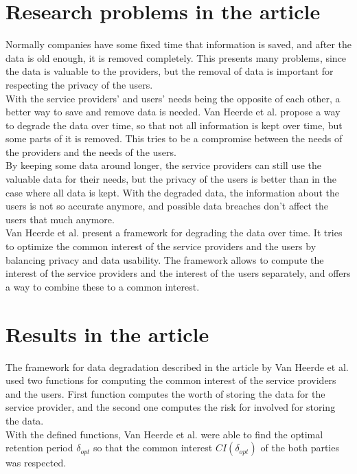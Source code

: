 \documentclass[a4paper,12pt,oneside,fleqn]{article}
\begin{document}
\section{Research problems in the article}

Normally companies have some fixed time that information is saved, and
after the data is old enough, it is removed completely. This presents
many problems, since the data is valuable to the providers, but the
removal of data is important for respecting the privacy of the
users.\\

With the service providers' and users' needs being the opposite of
each other, a better way to save and remove data is needed. Van Heerde
et al. propose a way to degrade the data over time, so that not all
information is kept over time, but some parts of it is removed. This
tries to be a compromise between the needs of the providers and the
needs of the users.\\

By keeping some data around longer, the service providers can still
use the valuable data for their needs, but the privacy of the users is
better than in the case where all data is kept. With the degraded
data, the information about the users is not so accurate anymore, and
possible data breaches don't affect the users that much anymore.\\

Van Heerde et al. present a framework for degrading the data over
time. It tries to optimize the common interest of the service
providers and the users by balancing privacy and data usability. The
framework allows to compute the interest of the service providers and
the interest of the users separately, and offers a way to combine
these to a common interest.

\section{Results in the article}

The framework for data degradation described in the article by Van
Heerde et al. used two functions for computing the common interest  of
the service providers and the users. First function computes the worth
of storing the data for the service provider, and the second one
computes the risk for involved for storing the data.\\

With the defined functions, Van Heerde et al. were able to find the
optimal retention period $\delta_{opt}$ so that the common interest
$CI(\delta_{opt})$ of the both parties was respected.\\
\end{document}
